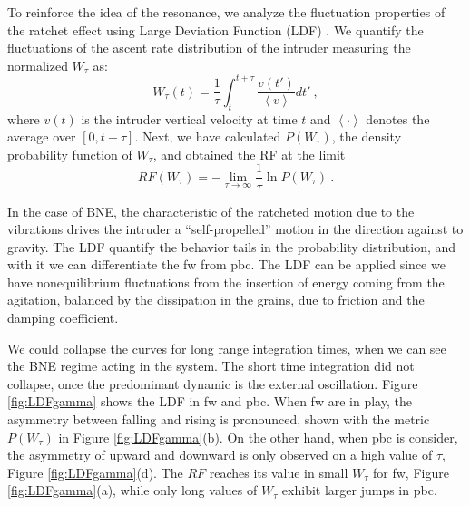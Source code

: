     To reinforce the idea of the resonance, we analyze the fluctuation properties of the ratchet effect using Large Deviation Function (LDF) \cite{Symmetry_properties_of_the_large-deviation_function_of_the_velocity_of_a_self-propelled_polar_particle, Large_Deviations_in_Physics}. We quantify the fluctuations of the ascent rate distribution of the intruder measuring the normalized  $W_{\tau}$ as:
%
\begin{equation}
    W_{\tau}(t) = \frac{1}{\tau} \int_t^{t+\tau} \frac{v(t')}{\left<v\right>} dt'~, 
\end{equation}
%
where $v(t)$ is the intruder vertical velocity at time $t$ and $\left< \cdot \right>$ denotes the average over $[0,t+\tau]$. Next, we have calculated $P(W_{\tau})$, the density probability function of $W_\tau$, and obtained the RF at the limit
%
\begin{equation}
    RF(W_\tau) = -\lim_{\tau \rightarrow \infty} \frac{1}{\tau} \ln P(W_\tau)~.
\end{equation}

    In the case of BNE, the characteristic of the ratcheted motion due to the vibrations drives the intruder a ``self-propelled'' motion in the direction against to gravity. The LDF quantify the behavior tails in the probability distribution, and with it we can differentiate the fw from pbc. The LDF can be applied since we have nonequilibrium fluctuations from the insertion of energy coming from the agitation, balanced by the dissipation in the grains, due to friction and the damping coefficient.

    We could collapse the curves for long range integration times, when we can see the BNE regime acting in the system. The short time integration did not collapse, once the predominant dynamic is the external oscillation. Figure \ref{fig:LDFgamma} shows the LDF in fw and pbc. When fw are in play, the asymmetry between falling and rising is pronounced, shown with the metric $P(W_{\tau})$ in Figure \ref{fig:LDFgamma}(b). On the other hand, when pbc is consider, the asymmetry of upward and downward is only observed on a high value of $\tau$, Figure \ref{fig:LDFgamma}(d). The $RF$ reaches its value in small $W_{\tau}$ for fw, Figure \ref{fig:LDFgamma}(a), while only long values of $W_{\tau}$ exhibit larger jumps in pbc.

